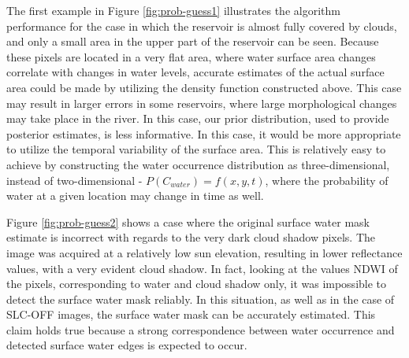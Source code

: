 The first example in Figure \ref{fig:prob-guess1} illustrates the algorithm performance for the case in which the reservoir is almost fully covered by clouds, and only a small area in the upper part of the reservoir can be seen. Because these pixels are located in a very flat area, where water surface area changes correlate with changes in water levels, accurate estimates of the actual surface area could be made by utilizing the density function constructed above. This case may result in larger errors in some reservoirs, where large morphological changes may take place in the river. In this case, our prior distribution, used to provide posterior estimates, is less informative. In this case, it would be more appropriate to utilize the temporal variability of the surface area. This is relatively easy to achieve by constructing the water occurrence distribution as three-dimensional, instead of two-dimensional - $P(C_{water}) = f(x,y,t)$, where the probability of water at a given location may change in time as well. 


Figure \ref{fig:prob-guess2} shows a case where the original surface water mask estimate is incorrect with regards to the very dark cloud shadow pixels. The image was acquired at a relatively low sun elevation, resulting in lower reflectance values, with a very evident cloud shadow. In fact, looking at the values \gls{NDWI} of the pixels, corresponding to water and cloud shadow only, it was impossible to detect the surface water mask reliably. In this situation, as well as in the case of SLC-OFF images, the surface water mask can be accurately estimated. This claim holds true because a strong correspondence between water occurrence and detected surface water edges is expected to occur.


